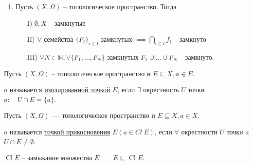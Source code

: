\documentclass{book}
\newcommand\N{\ensuremath{\mathbb{N}}}
\renewcommand\O{\ensuremath{\emptyset}}
\DeclareMathOperator{\Cl}{Cl}
\theoremstyle{definition}
\begin{document}
    \begin{corollary}
        \begin{enumerate}
            \item Пусть $(X, \Omega)$ -- топологическое пространство. 
            Тогда
                \begin{enumerate}
                    \item [I)] $\O , X$ -- замкнутые
                    \item [II)] $\forall $ семейства $\{F_i\}_{i\in I}$ замкнутых  $\implies  \bigcap\limits_{i \in  I} f_i$ -- замкнуто
                    \item [III)] $\forall N\in \N , \forall \{F_1, \ldots, F_N\}$ замкнутых $F_1\cup \ldots\cup  F_N$ -- замкнуто.
                \end{enumerate}
        \end{enumerate}
    \end{corollary}
    
    \begin{definition}
        Пусть $(X, \Omega)$ -- топологическое пространство и $E\subseteq X, a\in E$.
    
        $a$ называется \underline{изолированной точкой} $E$, если  $\exists$ окрестность $U$ точки  $a: \quad U\cap E = \{a\}$.
    \end{definition}
    
    \begin{definition}
        Пусть $(X, \Omega)$~--- топологическое пространство и $E\subseteq X, a\in X$.
    
        $a$ называется \underline{точкой прикосновения} $E \left( a\in Cl ~E \right) $, если $\forall $ окрестности $U$ точки $a$  $U\cap E \neq \O $.
    
        $\Cl E$ -- замыкание множества $E\qquad E\subseteq \Cl E$.
    \end{definition}
    
\end{document}
